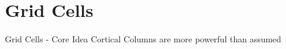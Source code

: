 \section{Grid Cells}


\begin{frame}[c]{Grid Cells - Core Idea}
    \LARGE
    Cortical Columns are more powerful than assumed
\end{frame}


